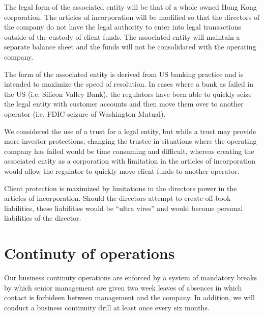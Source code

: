 The legal form of the associated entity will be that of a whole owned
Hong Kong corporation.  The articles of incorporation will be modified
so that the directors of the company do not have the legal authority
to enter into legal transactions outside of the custody of client
funds.  The associated entity will maintain a separate balance sheet
and the funds will not be consolidated with the operating company.

The form of the associated entity is derived from US banking practice
and is intended to maximize the speed of resolution.  In cases where a
bank as failed in the US (i.e. Silicon Valley Bank), the regulators
have been able to quickly seize the legal entity with customer
accounts and then move them over to another operator (i.e. FDIC
seizure of Washington Mutual).

We considered the use of a trust for a legal entity, but while a trust
may provide more investor protections, changing the trustee in
situations where the operating company has failed would be time
consuming and difficult, whereas creating the associated entity as a
corporation with limitation in the articles of incorporation would
allow the regulator to quickly move client funds to another operator.

Client protection is maximized by limitations in the directors power
in the articles of incorporation.  Should the directors attempt to
create off-book liabilities, these liabilities would be ``ultra
vires'' and would become personal liabilities of the director.

\section{Continuty of operations}
Our business continuty operations are enforced by a system of
mandatory breaks by which senior management are given two week leaves
of absences in which contact is forbideen between management and the
company.  In addition, we will conduct a business continuity drill at
least once every six months.

